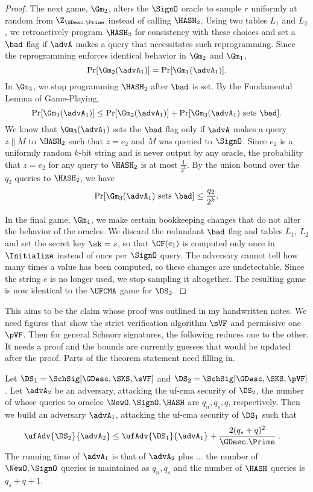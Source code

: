 \begin{proof}
	The next game, $\Gm_2$, alters the $\SignO$ oracle to sample $r$ uniformly at random from  $\Z_{\GDesc.\Prime}$ instead of calling $\HASH_2$. Using two tables $L_1$ and $L_2$, we retroactively program $\HASH_2$ for consistency with these choices and set a $\bad$ flag if $\advA$ makes a query that necessitates such reprogramming. Since the reprogramming enforces identical behavior in $\Gm_2$ and $\Gm_1$, 
		\[\Pr[\Gm_2(\advA_1)] = \Pr[\Gm_1(\advA_1)].\]
	In $\Gm_3$, we stop programming $\HASH_2$ after $\bad$ is set. By the Fundamental Lemma of Game-Playing, 
		\[\Pr[\Gm_3(\advA_1)] \leq \Pr[\Gm_2(\advA_1)] + \Pr[\Gm_3(\advA_1) \text{ sets } \bad].\]
	We know that $\Gm_3(\advA_1)$ sets the $\bad$ flag only if $\advA$ makes a query $z\|M$ to $\HASH_2$ such that $z = e_2$ and $M$ was queried to $\SignO$. Since $e_2$ is a uniformly random $k$-bit string and is never output by any oracle, the probability that $z = e_2$ for any query to $\HASH_2$ is at most $\frac{1}{2^k}$. By the union bound over the $q_2$ queries to $\HASH_2$, we have 
	\[ \Pr[\Gm_3(\advA_1) \text{ sets } \bad] \leq \frac{q_2}{2^k}. \]
	
	In the final game, $\Gm_4$, we make certain bookkeeping changes that do not alter the behavior of the oracles. We discard the redundant $\bad$ flag and tables $L_1$, $L_2$ and set the secret key $\sk = s$, so that $\CF(e_1)$ is computed only once in $\Initialize$ instead of once per $\SignO$ query. The adversary cannot tell how many times a value has been computed, so these changes are undetectable. Since the string $e$ is no longer used, we stop sampling it altogether. The resulting game is now identical to the $\UFCMA$ game for $\DS_2$. 
\end{proof}

 This aims to be the claim whose proof was outlined in my handwritten notes. We need figures that show the strict verification algorithm $\sVF$ and permissive one $\pVF$. Then for general Schnorr signatures, the following reduces one to the other. It needs a proof and the bounds are currently guesses that would be updated after the proof. Parts of the theorem statement need filling in.

\begin{theorem}\label{th-pvf-svf} Let $\DS_1 = \SchSig[\GDesc,\SKS,\sVF]$ and $\DS_2 = \SchSig[\GDesc,\SKS,\pVF]$. Let $\advA_2$ be an adversary, attacking the uf-cma security of $\DS_2$, the number of whose queries to oracles $\NewO,\SignO,\HASH$ are $q_n,q_s,q$, respectively. Then we build an adversary $\advA_1$, attacking the uf-cma security of $\DS_1$ such that 
\begin{align}
	\ufAdv{\DS_2}{\advA_2} &\leq \ufAdv{\DS_1}{\advA_1} +  \frac{2(q_s + q)^2}{\GDesc.\Prime}\;.
\end{align}
The running time of $\advA_1$ is that of $\advA_2$ plus ... the number of $\NewO,\SignO$ queries is maintained as $q_n,q_s$ and the number of $\HASH$ queries is $q_s + q + 1$.
\end{theorem}

